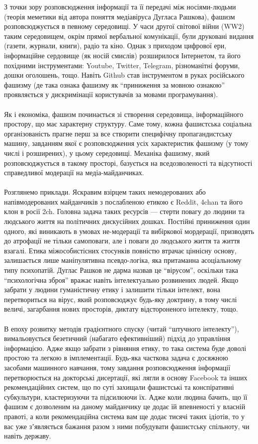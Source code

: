 З точки зору розповсюдження інформації та її передачі між носіями-людьми (теорія меметики від автора поняття медіавіруса Дугласа Рашкова), фашизм розповсюджується в певному середовищі. У часи другої світової війни (WW2) таким середовищем, окрім прямої вербальної комунікації, були друковані видання (газети, журнали, книги), радіо та кіно. Однак з приходом цифрової ери, інформаційне сердовище (як носій смислів) розширилося Інтернетом, та його похідними інструментами: Youtube, Twitter, Telegram, різноманітні форуми, дошки оголошень, тощо. Навіть Github став інструментом в руках російського фашизму (де така ознака фашизму як “приниження за мовною ознакою” проявляється у дискримінації користувачів за мовами програмування).
\\
\\
Як і економіка, фашизм починається зі створення середовища, інформаційного простору, що має характерну структуру. Саме тому, кожна фашистська соціальна організованість прагне перш за все створити специфічну пропагандистську машину, завданням якої є розповсюдження усіх характеристик фашизму (у тому числі і розширених), у цьому середовищі. Механіка фашизму, який розповсюджується в такому просторі, базується на вседозволеності та відсутності справедливої модерації на медіа-майданчиках.
\\
\\
Розглянемо приклади. Яскравим взірцем таких немодерованих або напівмодерованих майданчиків з послабленою етикою є Reddit, 4chan та його клон в росії 2ch. Головна задача таких ресурсів — стерти повагу до людини та людського життя на політичних дискусійних дошках. Постійні приниження один одного, які виникають в умовах не-модерації та вибіркової мордерації, призводять до атрофації не тільки самоповаги, але і поваги до людського життя та життя взагалі. Етика міжособистісних стосунків повністю втрачає ціннісну основу, залишається лише маніпулятивна псевдо-логіка, яка притаманна асоціальному типу психопатій. Дуглас Рашков не дарма назвав це “вірусом”, оскільки така “психологічна зброя” вражає навіть інтелектуально розвинених людей. Якщо забрати у людини гуманістичну етику і залишити тільки інтелект, вона перетвориться на вірус, який розповсюджує будь-яку доктрину, в тому числі величі, загарбання нових просторів, диктату відстороненого інтелекту, тощо.
\\
\\
В епоху розвитку методів градієнтного спуску (читай “штучного інтелекту”), вимальовується безетичний (набагато ефективніший) підхід до управління інформацією. Адже якщо забрати з рівняння етику, то така система буде доволі простою та легкою в імплементації. Будь-яка часткова задача є досяжною засобами машинного навчання, тому завдання розповсюдження інформації перетворюється на докторські дисертації, які лягли в основу Facebook та інших рекомендаційних систем, що по суті захищали фашистські та конспіративні субкультури, кластеризуючи та підсилюючи їх. Адже коли людина бачить, що її фашизм є дозволеним на даному майданчику це додає їй впевненості у власній правоті, а коли рекомендаційна система вам ще додає тисячі таких ідіотів, то у вас уже зʼявляється бажання разом з ними побудувати фашистську спільноту, чи навіть державу.
